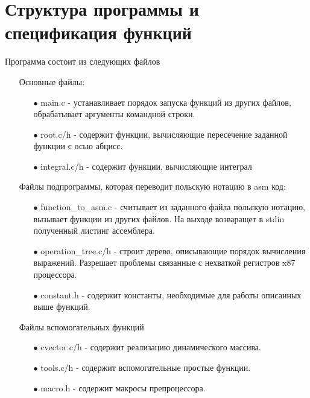 \documentclass[a4paper,12pt,titlepage,finall]{article}
\begin{document}
\newpage

\section{Структура программы и спецификация функций}

Программа состоит из следующих файлов

\begin{itemize}
  \item[] Основные файлы:
    \begin{itemize}
      \item[$\bullet$] main.c - устанавливает порядок запуска функций из других файлов, обрабатывает аргументы командной строки.
      \item[$\bullet$] root.c/h - содержит функции, вычисляющие пересечение заданной функции с осью абцисс.
      \item[$\bullet$] integral.c/h - содержит функции, вычисляющие интеграл
    \end{itemize}
  \item[] Файлы подпрограммы, которая переводит польскую нотацию в asm код:
  \begin{itemize}
    \item[$\bullet$] function\_to\_asm.c - считывает из заданного файла польскую нотацию, вызывает функции из других файлов. На выходе возваращет в stdin полученный листинг ассемблера.
    \item[$\bullet$] operation\_tree.c/h - строит дерево, описывающие порядок вычисления выражений. Разрешает проблемы связанные с нехваткой регистров x87 процессора.
    \item[$\bullet$] constant.h - содержит константы, необходимые для работы описанных выше функций.
\end{itemize}
  \item[] Файлы вспомогательных функций 
    \begin{itemize}
      \item[$\bullet$] cvector.c/h - содержит реализацию динамического массива.
      \item[$\bullet$] tools.c/h - содержит вспомогательные простые функции.
      \item[$\bullet$] macro.h - содержит макросы препроцессора.
    \end{itemize}
\end{itemize}
\end{document}
